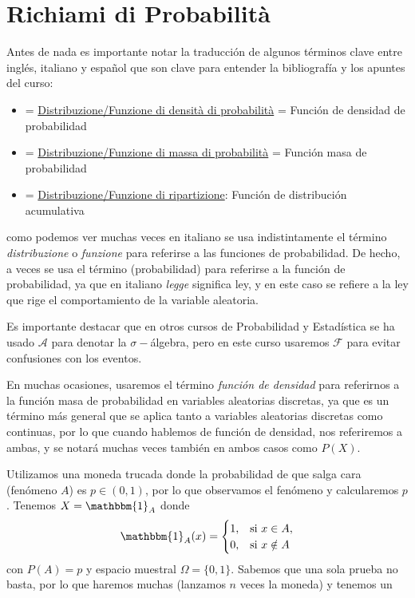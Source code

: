 \chapter{Richiami di Probabilità}

\noindent
Antes de nada es importante notar la traducción de algunos términos clave entre inglés, italiano y español que son clave para entender la bibliografía y los apuntes del curso:
\begin{itemize}
    \item {} = \underline{Distribuzione/Funzione di densità di probabilità} = Función de densidad de probabilidad
    \item {} = \underline{Distribuzione/Funzione di massa di probabilità} = Función masa de probabilidad
    \item {} = \underline{Distribuzione/Funzione di ripartizione}: Función de distribución acumulativa
\end{itemize}
como podemos ver muchas veces en italiano se usa indistintamente el término \textit{distribuzione} o \textit{funzione} para referirse a las funciones de probabilidad. De hecho, a veces se usa el término  (probabilidad) para referirse a la función de probabilidad, ya que en italiano \textit{legge} significa ley, y en este caso se refiere a la ley que rige el comportamiento de la variable aleatoria.
\begin{observacion}
    Es importante destacar que en otros cursos de Probabilidad y Estadística se ha usado $\mathcal{A}$ para denotar la $\sigma-$álgebra, pero en este curso usaremos $\mathcal{F}$ para evitar confusiones con los eventos.
\end{observacion}

\begin{observacion}
    En muchas ocasiones, usaremos el término \textit{función de densidad} para referirnos a la función masa de probabilidad en variables aleatorias discretas, ya que es un término más general que se aplica tanto a variables aleatorias discretas como continuas, por lo que cuando hablemos de función de densidad, nos referiremos a ambas, y se notará muchas veces también en ambos casos como $P(X)$.
\end{observacion}

\noindent
Utilizamos una moneda trucada donde la probabilidad de que salga cara (fenómeno $A$) es $p\in (0,1)$, por lo que observamos el fenómeno y calcularemos $p$. Tenemos $X=\mathbbm{1}_A$ donde 
\begin{equation*}
    \mathbbm{1}_A(x) =
    \begin{cases}
    1, & \text{si } x \in A,\\
    0, & \text{si } x \notin A
    \end{cases}
\end{equation*}
con $P(A)=p$ y espacio muestral $\Omega=\{0,1\}$. Sabemos que una sola prueba no basta, por lo que haremos muchas (lanzamos $n$ veces la moneda) y tenemos un 

